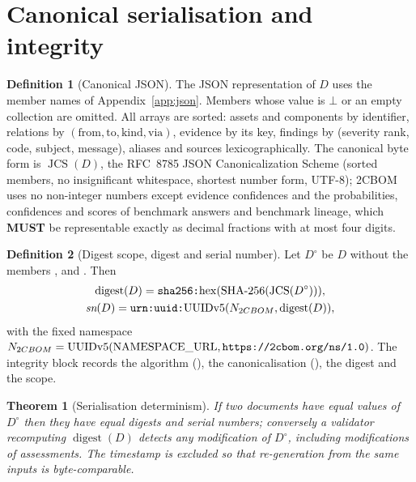 \documentclass[11pt,a4paper]{article}
\newcommand{\codem}[1]{\texttt{\detokenize{#1}}}
\newcommand{\twocbom}{2CBOM}
\newcommand{\MUST}{\textbf{MUST}}
\newcommand{\digest}{\operatorname{digest}}
\newcommand{\JCS}{\operatorname{JCS}}
\theoremstyle{definition}
\newtheorem{definition}{Definition}[section]
\theoremstyle{plain}
\newtheorem{theorem}{Theorem}
\begin{document}
\section{Canonical serialisation and integrity}\label{sec:serialisation}
\begin{definition}[Canonical JSON]
The JSON representation of $D$ uses the member names of Appendix~\ref{app:json}. Members whose
value is $\bot$ or an empty collection are omitted. All arrays are sorted: assets and
components by identifier, relations by $(\text{from}, \text{to}, \text{kind}, \text{via})$,
evidence by its key, findings by (severity rank, code, subject, message), aliases and sources
lexicographically. The canonical byte form is $\JCS(D)$, the RFC~8785 JSON Canonicalization
Scheme (sorted members, no insignificant whitespace, shortest number form, UTF-8); \twocbom{}
uses no non-integer numbers except evidence confidences and the probabilities, confidences and
scores of benchmark answers and benchmark lineage, which \MUST{} be representable exactly as
decimal fractions with at most four digits.
\end{definition}

\begin{definition}[Digest scope, digest and serial number]
Let $D^{\circ}$ be $D$ without the members ,  and
. Then
\begin{gather*}
\digest(D) = \codem{sha256:}\mathrm{hex}(\mathrm{SHA\text{-}256}(\JCS(D^{\circ}))),\\
\textit{sn}(D) = \codem{urn:uuid:}\mathrm{UUIDv5}(N_{\twocbom}, \digest(D)),
\end{gather*}
with the fixed namespace $N_{\twocbom} = \mathrm{UUIDv5}(\mathrm{NAMESPACE\_URL},
\codem{https://2cbom.org/ns/1.0})$. The integrity block records the algorithm
(), the canonicalisation (), the digest and the scope.
\end{definition}

\begin{theorem}[Serialisation determinism]
If two documents have equal values of $D^{\circ}$ then they have equal digests and serial
numbers; conversely a validator recomputing $\digest(D)$ detects any modification of
$D^{\circ}$, including modifications of assessments. The timestamp is excluded so that
re-generation from the same inputs is byte-comparable.
\end{theorem}
\end{document}
